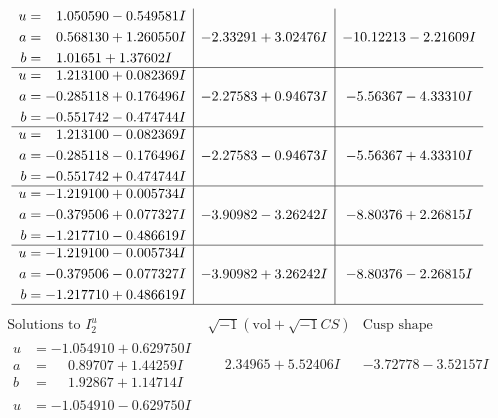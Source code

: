 \documentclass[1p]{elsarticle_modified}
\theoremstyle{definition}
\newcommand{\I}{\sqrt{-1}}
\begin{document}
$$\begin{array}{c|c|c}
\begin{aligned}
u &= \phantom{-}1.050590 - 0.549581 I \\
a &= \phantom{-}0.568130 + 1.260550 I \\
b &= \phantom{-}1.01651 + 1.37602 I\end{aligned}
 & -2.33291 + 3.02476 I & -10.12213 - 2.21609 I \\ \hline\begin{aligned}
u &= \phantom{-}1.213100 + 0.082369 I \\
a &= -0.285118 + 0.176496 I \\
b &= -0.551742 - 0.474744 I\end{aligned}
 & -2.27583 + 0.94673 I & -5.56367 - 4.33310 I \\ \hline\begin{aligned}
u &= \phantom{-}1.213100 - 0.082369 I \\
a &= -0.285118 - 0.176496 I \\
b &= -0.551742 + 0.474744 I\end{aligned}
 & -2.27583 - 0.94673 I & -5.56367 + 4.33310 I \\ \hline\begin{aligned}
u &= -1.219100 + 0.005734 I \\
a &= -0.379506 + 0.077327 I \\
b &= -1.217710 - 0.486619 I\end{aligned}
 & -3.90982 - 3.26242 I & -8.80376 + 2.26815 I \\ \hline\begin{aligned}
u &= -1.219100 - 0.005734 I \\
a &= -0.379506 - 0.077327 I \\
b &= -1.217710 + 0.486619 I\end{aligned}
 & -3.90982 + 3.26242 I & -8.80376 - 2.26815 I\\
 \hline 
 \end{array}$$\newpage$$\begin{array}{c|c|c}  
\text{Solutions to }I^u_{2}& \I (\text{vol} + \sqrt{-1}CS) & \text{Cusp shape}\\
 \hline 
\begin{aligned}
u &= -1.054910 + 0.629750 I \\
a &= \phantom{-}0.89707 + 1.44259 I \\
b &= \phantom{-}1.92867 + 1.14714 I\end{aligned}
 & \phantom{-}2.34965 + 5.52406 I & -3.72778 - 3.52157 I \\ \hline\begin{aligned}
u &= -1.054910 - 0.629750 I \\

\end{aligned}
\end{array}$$
\end{document}

